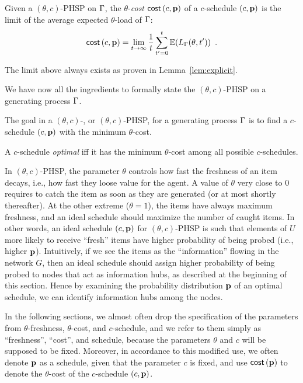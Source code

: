 \begin{definition}
	Given a $(\theta,c)$-PHSP on $\Gamma$, the $\theta$-\emph{cost} $\mathsf{cost}\left( c,\mathbf{p} \right)$
	of a $c$-schedule $(c,\mathbf{p})$ is the limit of the average expected
	$\theta$-load of $\Gamma$:
	\[
		\mathsf{cost}\left( c,\mathbf{p} \right)=\lim_{t\rightarrow\infty}\frac{1}{t}\sum_{t'=0}^{t}\mathbb{E}(L_\Gamma(\theta,t'))\enspace.
	\]
\end{definition}
The limit above always exists as proven in Lemma~\ref{lem:explicit}.

We have now all the ingredients to formally state the $(\theta,c)$-PHSP on a
generating process $\Gamma$.

\begin{definition}[\probname]\label{def:phsp}
	The goal in a $(\theta,c)$-{\probname}, or $(\theta,c)$-PHSP, for a
	generating process $\Gamma$ is to find a $c$-schedule $(c,\mathbf{p})$ with the
	minimum $\theta$-cost.

	A $c$-schedule \emph{optimal} iff it has the minimum $\theta$-cost among all
	possible $c$-schedules.
\end{definition}

In $(\theta,c)$-PHSP, the parameter $\theta$ controls how fast the freshness of
an item decays, i.e., how fast they loose value for the agent. A value of
$\theta$ very close to $0$ requires to catch the item  as soon as they are
generated (or at most shortly thereafter). At the other extreme ($\theta=1$),
the items have always maximum freshness, and an ideal schedule should maximize
the number of caught items.  In other words, an ideal schedule $(c,\mathbf{p})$ for
$(\theta, c)$-PHSP is such that elements of $U$ more likely to receive ``fresh''
items have higher probability of being probed (i.e., higher $\mathbf{p}$). Intuitively,
if we see the items as the ``information'' flowing in the network $G$, then an
ideal schedule should assign higher probability of being probed to nodes that
act as information hubs, as described at the beginning of this section. Hence by
examining the probability distribution $\mathbf{p}$ of an optimal schedule, we can
identify information hubs among the nodes.

In the following sections, we almost often drop the specification of the
parameters from $\theta$-freshness, $\theta$-cost, and $c$-schedule, and we
refer to them simply as ``freshness'', ``cost'', and schedule, because the
parameters $\theta$ and $c$ will be supposed to be fixed. Moreover, in
accordance to this modified use, we often denote $\mathbf{p}$ as a schedule, given that
the parameter $c$ is fixed, and use $\mathsf{cost}\left( \mathbf{p} \right)$ to denote the $\theta$-cost of
the $c$-schedule $(c,\mathbf{p})$.
